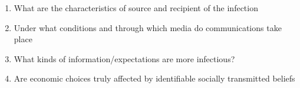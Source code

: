 \begin{enumerate}
    \item What are the characteristics of source and recipient of the infection
    \item Under what conditions and through which media do communications take place
    \item What kinds of information/expectations are more infectious?
    \item Are economic choices truly affected by identifiable socially transmitted beliefs
    \end{enumerate}
